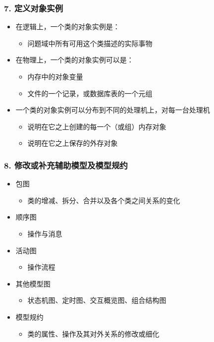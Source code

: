 \documentclass[compress]{beamer}
\begin{document}
\begin{frame}[fragile]
  \frametitle{7. 定义对象实例}
   {
  \begin{itemize}
    \item 在逻辑上，一个类的对象实例是：
      \begin{itemize}
        \item 问题域中所有可用这个类描述的实际事物
      \end{itemize}
    \item 在物理上，一个类的对象实例可以是：
      \begin{itemize}
        \item 内存中的对象变量
        \item 文件的一个记录，或数据库表的一个元组
      \end{itemize}
    \item 一个类的对象实例可以分布到不同的处理机上，对每一台处理机
      \begin{itemize}
        \item 说明在它之上创建的每一个（或组）内存对象
        \item 说明在它之上保存的外存对象
      \end{itemize}
  \end{itemize}
}

   {
    \usebox{\ooinstancebox}
  }
\end{frame}

\begin{frame}
  \frametitle{8. 修改或补充辅助模型及模型规约}
  \begin{itemize}
    \item 包图
      \begin{itemize}
        \item 类的增减、拆分、合并以及各个类之间关系的变化 
      \end{itemize}
    \item 顺序图
      \begin{itemize}
        \item 操作与消息
      \end{itemize}
    \item 活动图
      \begin{itemize}
        \item 操作流程
      \end{itemize}
    \item 其他模型图
      \begin{itemize}
        \item 状态机图、定时图、交互概览图、组合结构图 
      \end{itemize}
    \item 模型规约
      \begin{itemize}
        \item 类的属性、操作及其对外关系的修改或细化 
      \end{itemize}
  \end{itemize}

\end{frame}
\end{document}
